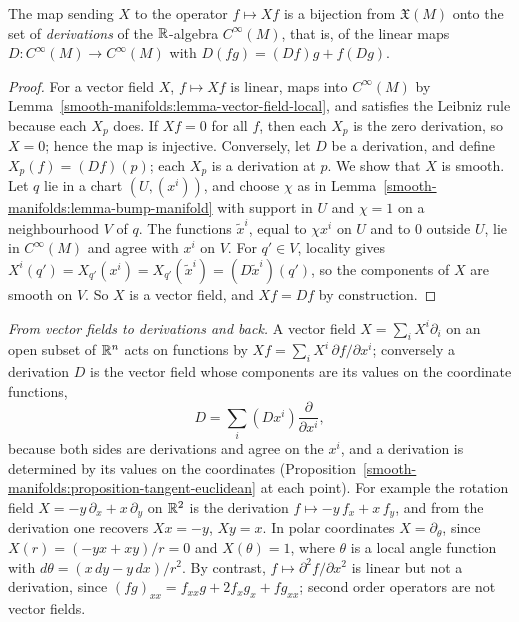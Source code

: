 \begin{proposition}\label{smooth-manifolds:proposition-vector-fields-derivations}
The map sending $X$ to the operator $f \mapsto Xf$ is a bijection from $\mathfrak{X}(M)$ onto the set of \emph{derivations} of the $\mathbb{R}$-algebra
$C^\infty(M)$, that is, of the linear maps $D \colon C^\infty(M) \to C^\infty(M)$ with $D(fg) = (Df)g + f(Dg)$.
\end{proposition}

\begin{proof}
For a vector field $X$, $f \mapsto Xf$ is linear, maps into $C^\infty(M)$ by Lemma~\ref{smooth-manifolds:lemma-vector-field-local}, and satisfies the Leibniz
rule because each $X_p$ does. If $Xf = 0$ for all $f$, then each $X_p$ is the zero derivation, so $X = 0$; hence the map is injective. Conversely, let $D$ be a
derivation, and define $X_p(f) = (Df)(p)$; each $X_p$ is a derivation at $p$. We show that $X$ is smooth. Let $q$ lie in a chart $(U, (x^i))$, and choose $\chi$
as in Lemma~\ref{smooth-manifolds:lemma-bump-manifold} with support in $U$ and $\chi = 1$ on a neighbourhood $V$ of $q$. The functions $\widetilde{x}^i$, equal to
$\chi x^i$ on $U$ and to $0$ outside $U$, lie in $C^\infty(M)$ and agree with $x^i$ on $V$. For $q' \in V$, locality gives
$X^i(q') = X_{q'}(x^i) = X_{q'}(\widetilde{x}^i) = (D\widetilde{x}^i)(q')$, so the components of $X$ are smooth on $V$. So $X$ is a vector field, and
$Xf = Df$ by construction.
\end{proof}

\begin{example}\label{smooth-manifolds:example-derivations-fields}
\emph{From vector fields to derivations and back.} A vector field $X = \sum_iX^i\partial_i$ on an open subset of $\mathbb{R}^n$ acts on functions by $Xf = \sum_iX^i\,\partial f/\partial x^i$; conversely a
derivation $D$ is the vector field whose components are its values on the coordinate functions,
\[
D = \sum_i(Dx^i)\frac{\partial}{\partial x^i},
\]
because both sides are derivations and agree on the $x^i$, and a derivation is determined by its values on the coordinates (Proposition~\ref{smooth-manifolds:proposition-tangent-euclidean}
at each point). For example the rotation field $X = -y\,\partial_x + x\,\partial_y$ on $\mathbb{R}^2$ is the derivation $f \mapsto -y\,f_x + x\,f_y$, and from the derivation one recovers
$Xx = -y$, $Xy = x$. In polar coordinates $X = \partial_\theta$, since $X(r) = (-y x + x y)/r = 0$ and $X(\theta) = 1$, where $\theta$ is a local angle function with
$d\theta = (x\,dy - y\,dx)/r^2$. By contrast, $f \mapsto \partial^2f/\partial x^2$ is linear but not a derivation, since $(fg)_{xx} = f_{xx}g + 2f_xg_x + fg_{xx}$; second order operators
are not vector fields.
\end{example}


